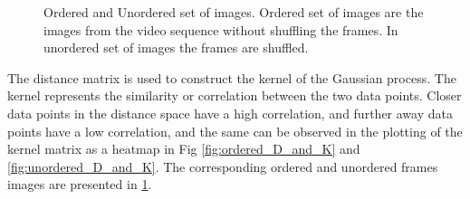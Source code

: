 	\begin{figure}[h]
		\centering
		\qquad
		\caption{Ordered and Unordered set of images. Ordered set of images are the images from the video sequence without shuffling the frames. In unordered set of images the frames are shuffled. }%
		\label{fig:ordered_and_unordered_images}%
	\end{figure}
	
	The distance matrix is used to construct the kernel of the Gaussian process. The kernel represents the similarity or correlation between the two data points. Closer data points in the distance space have a high correlation, and further away data points have a low correlation, and the same can be observed in the plotting of the kernel matrix as a heatmap in Fig \ref{fig:ordered_D_and_K} and \ref{fig:unordered_D_and_K}. The corresponding ordered and unordered frames images are presented in \ref{fig:ordered_and_unordered_images}.  
	
